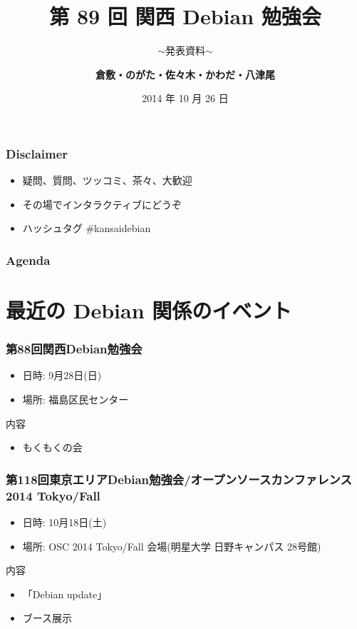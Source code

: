 \documentclass[cjk,dvipdfmx,10pt,compress,%
hyperref={bookmarks=true,bookmarksnumbered=true,bookmarksopen=false,%
colorlinks=false,%
pdftitle={第 89 回 関西 Debian 勉強会},%
pdfauthor={倉敷・のがた・佐々木・かわだ・八津尾},%
pdfsubject={資料},%
}]{beamer}
\title{第 89 回 関西 Debian 勉強会}
\subtitle{$\sim$発表資料$\sim$}
\author[かわだ てつたろう]{{\large\bf 倉敷・のがた・佐々木・かわだ・八津尾}}
\institute[Debian JP]{{\normalsize\tt 関西 Debian 勉強会}}
\date{{\small 2014 年 10 月 26 日}}
\begin{document}
\settitleslide
\begin{frame}
\titlepage
\end{frame}
\setdefaultslide

\begin{frame}[fragile]
  \frametitle{Disclaimer}
  \begin{itemize}
  \item 疑問、質問、ツッコミ、茶々、\alert{大歓迎}
  \item その場でインタラクティブにどうぞ
  \item ハッシュタグ \#kansaidebian
\end{itemize}
\end{frame}

\begin{frame}[fragile]
\frametitle{Agenda}

\tableofcontents

\end{frame}

\section{最近の Debian 関係のイベント}


\begin{frame}[fragile]
  \frametitle{第88回関西Debian勉強会}
  \begin{itemize}
  \item 日時: 9月28日(日)
  \item 場所: 福島区民センター
  \end{itemize}
  \begin{block}{内容}
    \begin{itemize}
    \item もくもくの会
    \end{itemize}
  \end{block}
\end{frame}

\begin{frame}[fragile]
  \frametitle{第118回東京エリアDebian勉強会/オープンソースカンファレンス2014 Tokyo/Fall}
  \begin{itemize}
  \item 日時: 10月18日(土)
  \item 場所: OSC 2014 Tokyo/Fall 会場(明星大学 日野キャンパス 28号館)
  \end{itemize}
  \begin{block}{内容}
    \begin{itemize}
    \item 「Debian update」
    \item ブース展示
    \end{itemize}
  \end{block}
\end{frame}
\end{document}
